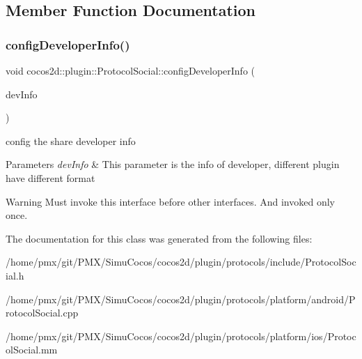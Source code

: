 \subsection{Member Function Documentation}
\mbox{\label{classcocos2d_1_1plugin_1_1ProtocolSocial_a804a22f9b68ed86375eafdc794a6cb80}} 
\subsubsection{\texorpdfstring{config\+Developer\+Info()}{configDeveloperInfo()}}
{\footnotesize\ttfamily void cocos2d\+::plugin\+::\+Protocol\+Social\+::config\+Developer\+Info (\begin{DoxyParamCaption}\item[{T\+Social\+Developer\+Info}]{dev\+Info }\end{DoxyParamCaption})}



config the share developer info 


\begin{DoxyParams}{Parameters}
{\em dev\+Info} & This parameter is the info of developer, different plugin have different format \\
\hline
\end{DoxyParams}
\begin{DoxyWarning}{Warning}
Must invoke this interface before other interfaces. And invoked only once. 
\end{DoxyWarning}


The documentation for this class was generated from the following files\+:\begin{DoxyCompactItemize}
\item 
/home/pmx/git/\+P\+M\+X/\+Simu\+Cocos/cocos2d/plugin/protocols/include/Protocol\+Social.\+h\item 
/home/pmx/git/\+P\+M\+X/\+Simu\+Cocos/cocos2d/plugin/protocols/platform/android/Protocol\+Social.\+cpp\item 
/home/pmx/git/\+P\+M\+X/\+Simu\+Cocos/cocos2d/plugin/protocols/platform/ios/Protocol\+Social.\+mm\end{DoxyCompactItemize}
